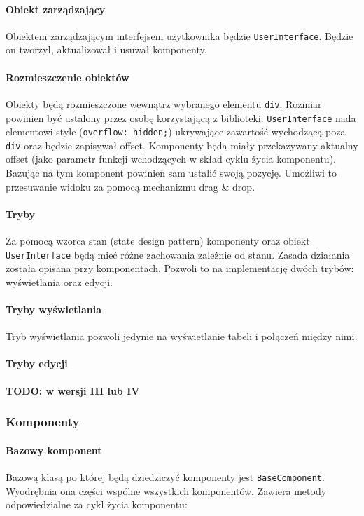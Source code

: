 \documentclass{article}
\def\code#1{\texttt{#1}}
\begin{document}
\paragraph{Obiekt zarządzający}
Obiektem zarządzającym interfejsem użytkownika będzie \code{UserInterface}. Będzie on tworzył, aktualizował i usuwał komponenty.

\paragraph{Rozmieszczenie obiektów}
Obiekty będą rozmieszczone wewnątrz wybranego elementu \code{div}. Rozmiar powinien być ustalony przez osobę korzystającą z biblioteki. \code{UserInterface} nada elementowi style (\code{overflow: hidden;}) ukrywające zawartość wychodzącą poza \code{div} oraz będzie zapisywał offset. Komponenty będą miały przekazywany aktualny offset (jako parametr funkcji wchodzących w skład cyklu życia komponentu). Bazując na tym komponent powinien sam ustalić swoją pozycję. Umożliwi to przesuwanie widoku za pomocą mechanizmu drag \& drop.

\paragraph{Tryby}
Za pomocą wzorca stan (state design pattern) komponenty oraz obiekt \code{UserInterface} będą mieć różne zachowania zależnie od stanu. Zasada działania została \hyperref[p:eventsHandling]{opisana przy komponentach}. Pozwoli to na implementację dwóch trybów: wyświetlania oraz edycji.

\paragraph{Tryby wyświetlania}
Tryb wyświetlania pozwoli jedynie na wyświetlanie tabeli i połączeń między nimi.

\paragraph{Tryby edycji}
\textbf{TODO: w wersji III lub IV}

\subsubsection{Komponenty}
\label{sssec:components}

\paragraph{Bazowy komponent}
Bazową klasą po której będą dziedziczyć komponenty jest  \code{BaseComponent}. Wyodrębnia ona części wspólne wszystkich komponentów. Zawiera metody odpowiedzialne za cykl życia komponentu:
\end{document}
